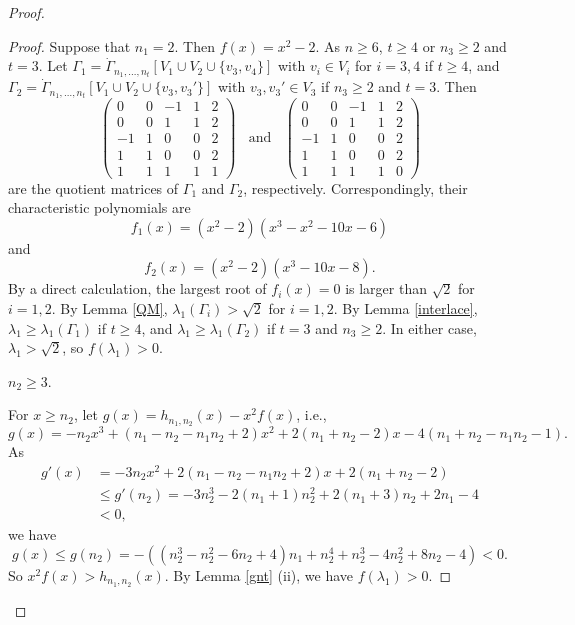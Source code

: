 \documentclass[10pt,a4paper]{amsart}
\numberwithin{equation}{section}
\begin{document}
\begin{proof}
\begin{proof}
Suppose that $n_1=2$. Then $f(x)=x^2-2$. As $n\ge 6$, $t\ge 4$ or $n_3\ge 2$ and $t=3$. 
Let $\Gamma_1=\dot\Gamma_{n_1, \dots,  n_t}[V_1\cup V_2\cup \{v_3, v_4\}]$ with $v_i\in V_i$ for $i=3, 4$ if $t\ge 4$, and $\Gamma_2=\dot\Gamma_{n_1, \dots,  n_t}[V_1\cup V_2\cup \{v_3, v_3'\}]$ with $v_3, v_3'\in V_3$ if $n_3\ge 2$ and $t=3$. Then 
\[
\begin{pmatrix}
	0 & 0 & -1 & 1 & 2 \\
	0 & 0 & 1 & 1 & 2 \\
	-1 & 1 & 0 &  0 & 2 \\
	1 & 1 & 0 &  0 & 2 \\
	1 & 1 & 1 & 1 & 1 
\end{pmatrix}\ \ \ \ 
\text{and} \ \ \ \ 
\begin{pmatrix}
	0 & 0 & -1 & 1 & 2 \\
	0 & 0 & 1 & 1 & 2 \\
	-1 & 1 & 0 & 0 & 2 \\
	1 & 1 & 0 & 0 & 2 \\
	1 & 1 & 1 & 1 & 0 
\end{pmatrix}
\]
are the quotient matrices of $\Gamma_1$ and $\Gamma_2$, respectively. Correspondingly, their characteristic polynomials are 
\[
f_1(x)=(x^2-2)(x^3-x^2-10x-6)
\]
and 
\[
f_2(x)=(x^2-2)(x^3-10x-8). 
\]
By a direct calculation, the largest root of $f_i(x)=0$ is larger than $\sqrt{2}$ for $i=1,2$. 
By Lemma \ref{QM}, $\lambda_1(\Gamma_i)>\sqrt{2}$ for $i=1,2$. 
By Lemma \ref{interlace}, $\lambda_1\ge \lambda_1(\Gamma_1)$ if $t\ge 4$, and $\lambda_1\ge \lambda_1(\Gamma_2)$ if $t=3$ and $n_3\ge 2$. 
In either case, $\lambda_1>\sqrt{2}$, so $f(\lambda_1)>0$. 


 $n_2\ge 3$. 

For $x\ge n_2$, let $g(x)=h_{n_1,n_2}(x)-x^2f(x)$, i.e., 
\[
g(x)= -n_2x^3+(n_1-n_2-n_1n_2+2)x^2+2(n_1+n_2-2)x-4(n_1+n_2-n_1n_2-1).
\]
As 
\begin{align*}
g'(x)& =-3n_2x^2+2(n_1-n_2-n_1n_2+2)x+2(n_1+n_2-2)\\
& \le g'(n_2)=-3n_2^3-2(n_1+1)n_2^2+2(n_1+3)n_2+2n_1-4\\
& <0, 
\end{align*}
we have
\[
g(x)\le g(n_2)=-((n_2^3-n_2^2-6n_2+4)n_1+n_2^4+n_2^3-4n_2^2+8n_2-4)<0. 
\]
So $x^2f(x)> h_{n_1, n_2}(x)$. 
By Lemma \ref{gnt} (ii), we have $f(\lambda_1)>0$.
\end{proof}






\end{proof}
\end{document}
